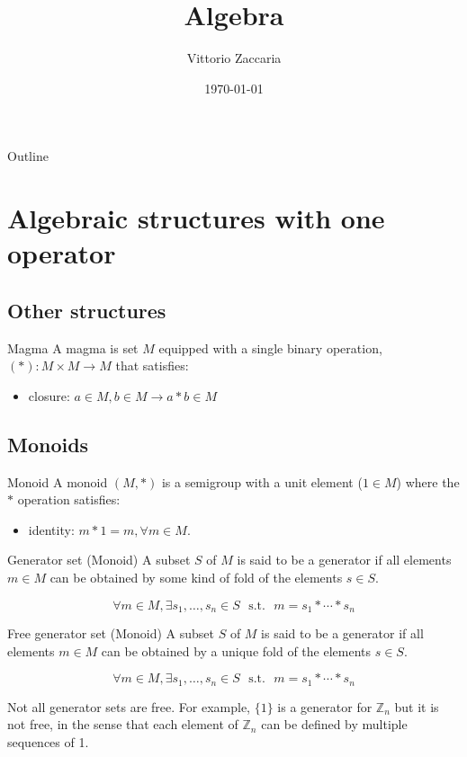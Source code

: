 \documentclass[presentation]{beamer}
\author{Vittorio Zaccaria}
\date{\today}
\title{Algebra}
\begin{document}
\maketitle
\begin{frame}{Outline}
\tableofcontents
\end{frame}


\section{Algebraic structures with one operator}
\label{sec:orgec765ff}
\subsection{Other structures}
\label{sec:org45fff7f}
\begin{frame}[label={sec:org0b38779}]{Magma}
A magma is set \(M\) equipped with a single binary operation,
\((*): M \times M \rightarrow M\) that satisfies:

\begin{itemize}
\item \alert{closure}: \(a \in M, b \in M \rightarrow a * b \in M\)
\end{itemize}
\end{frame}

\subsection{Monoids}
\label{sec:org3582f53}
\begin{frame}[label={sec:orgd749f48}]{Monoid}
A monoid \((M,*)\) is a \alert{semigroup} with a unit element (\(1 \in M\)) where the \(*\)
operation satisfies:

\begin{itemize}
\item \alert{identity}: \(m * 1 = m, \forall m \in M\).
\end{itemize}
\end{frame}

\begin{frame}[label={sec:org2e7b4ae}]{Generator set (Monoid)}
A subset \(S\) of \(M\) is said to be a generator if all elements \(m \in M\)
can be obtained by some kind of \alert{fold} of the elements \(s \in S\).

\[
      \forall m \in M, \exists s_1, \ldots, s_n \in S \textrm{~~s.t.~~} m = s_1 * \cdots * s_n
    \]
\end{frame}

\begin{frame}[label={sec:orgaa775c6}]{Free generator set (Monoid)}
A subset \(S\) of \(M\) is said to be a generator if all elements \(m \in M\)
can be obtained by a \alert{unique fold} of the elements \(s \in S\).

\[
      \forall m \in M, \exists s_1, \ldots, s_n \in S \textrm{~~s.t.~~} m = s_1 * \cdots * s_n
    \]

Not all generator sets are free. For example, \(\{1\}\) is a generator for
\(\mathbb{Z}_n\) but it is not free, in the sense that each element of
\(\mathbb{Z}_n\) can be defined by multiple sequences of 1.
\end{frame}
\end{document}
